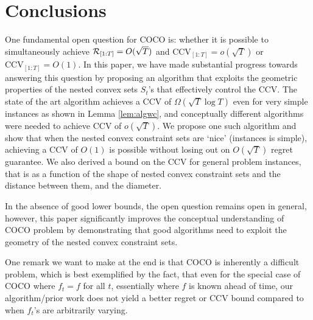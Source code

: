 \section{Conclusions}
One fundamental open question for COCO is: whether it is possible to simultaneously achieve $\mathcal{R}_{[1:T]} =O(\sqrt{T})$ and $\text{CCV}_{[1:T]} = o(\sqrt{T})$ or $\text{CCV}_{[1:T]} = O(1)$.
In this paper, we have made substantial progress towards answering this question by proposing an algorithm that exploits the geometric properties of the nested convex sets $S_t$'s that effectively 
control the CCV. The state of the art algorithm \cite{Sinha2024} achieves a CCV of $\Omega(\sqrt{T}\log T)$ even for very simple instances as shown in Lemma \ref{lem:algwc}, 
and conceptually different algorithms were needed to achieve CCV of $o(\sqrt{T})$. 
We propose one such algorithm and show that when the nested convex constraint sets are `nice' (instances  is simple), achieving a CCV of $O(1)$ is possible without losing out on $O(\sqrt{T})$ regret guarantee. We also derived a bound on the CCV for general problem instances, that is as a function of the shape of nested convex constraint sets and the distance between them, and the diameter. 

In the absence of good lower bounds, the open question remains open in general, however,
 this paper significantly improves the conceptual understanding of COCO problem by demonstrating that good algorithms need to exploit the geometry of the nested convex constraint sets.

One remark we want to make at the end is that COCO is inherently a difficult problem, which is best exemplified by the fact, that even for the special case of COCO where $f_t=f$ for all $t$, essentially where $f$ is known ahead of time, our algorithm/prior work does not yield a better regret or CCV bound compared to when $f_t$'s are arbitrarily varying. 